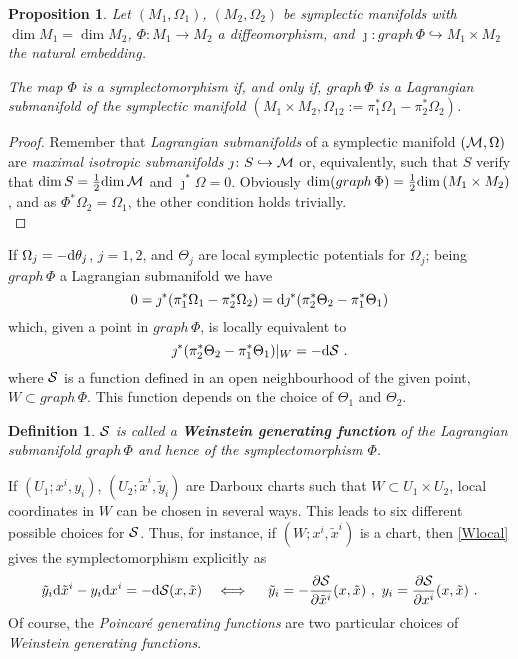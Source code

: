 \documentclass[12pt]{report}
\newtheorem{prop}[teor]{Proposition}
\newtheorem{definition}[teor]{Definition}
\def\beq{\begin{equation}}
\def\eeq{\end{equation}}
\def\derpar#1#2{\frac{\partial{#1}}{\partial{#2}}}
\def\qed{\ifvmode\removelastskip\fi
{\unskip\nobreak\hfil\penalty50\hbox{}\nobreak\hfil
\hbox{\vrule height1.2ex width1.2ex}\parfillskip=0pt
\finalhyphendemerits=0 \par\smallskip}}
\def\d{{\rm d}}
\begin{document}
\begin{prop}
Let $(M_1,\Omega_1)$, $(M_2,\Omega_2)$ be symplectic manifolds
with $\dim M_1 = \dim M_2$,
 $\Phi\colon M_1\to M_2$ a diffeomorphism, and
${\jmath}\colon graph\,\Phi\hookrightarrow M_1\times M_2$ the natural embedding.

The map $\Phi$ is a symplectomorphism if, and only if,
$graph\,\Phi$ is a Lagrangian submanifold of the symplectic manifold
$(M_1\times M_2,\Omega_{12}:=\pi_1^*\Omega_1-\pi_2^*\Omega_2)$.
\end{prop}
\begin{proof}
Remember that {\sl Lagrangian submanifolds} of a symplectic manifold 
$({\cal M},\Omega)$ are {\sl maximal isotropic submanifolds}
${\jmath}\colon S\hookrightarrow{\cal M}$ or, equivalently,
such that $S$ verify that ${\rm dim}\,S=\frac{1}{2}{\rm dim}\,{\cal M}$
and ${\jmath}^*\Omega=0$.
Obviously ${\rm dim}(graph\,\Phi)=\frac{1}{2}{\rm dim}\,(M_1\times M_2)$ ,
and as $\Phi^*\Omega_2=\Omega_1$,
the other condition holds trivially.
\\ \qed  \end{proof}

If $\Omega_j=-\d\theta_j$, $j=1,2$,
and $\Theta_j$ are local symplectic potentials for $\Omega_j$;
being $graph\,\Phi$ a Lagrangian submanifold we have
\beq
0=\jmath^*(\pi_1^*\Omega_1-\pi_2^*\Omega_2)=\d\jmath^*(\pi_2^*\Theta_2-\pi_1^*\Theta_1)
\eeq
which, given a point in  $graph\,\Phi$, is locally equivalent to
\beq
 \jmath^*(\pi_2^*\Theta_2-\pi_1^*\Theta_1)\vert_W=-\d{\cal S} \ .
\label{Wlocal}
\eeq
where ${\cal S}$ is a function defined in 
an open neighbourhood of the given point, $W\subset graph\,\Phi$.
This function depends on the choice of $\Theta_1$ and $\Theta_2$.

\begin{definition}
${\cal S}$ is called a
\textbf{Weinstein generating function} of the Lagrangian submanifold $graph\,\Phi$
and hence of the symplectomorphism $\Phi$.
\end{definition}

If  $(U_1; x^i,y_i)$, $(U_2; \tilde x^i,\tilde y_i)$ are Darboux charts such that
$W\subset U_1\times U_2$, local coordinates in $W$  can be chosen in several ways.
This leads to six different possible choices for ${\cal S}$.
Thus, for instance,  if $(W; x^i,\tilde x^i)$ is a chart,
then \eqref{Wlocal} gives the symplectomorphism  explicitly as
$$
\tilde y_i\d\tilde x^i-y_i\d x^i=-\d {\cal S}(x,\tilde x)
\quad \Longleftrightarrow\ \quad
\tilde y_i=-\derpar{{\cal S}}{\tilde x^i}(x,\tilde x)\ , \ y_i=\derpar{{\cal S}}{x^i}(x,\tilde x)\ .
$$
Of course, the {\sl Poincar\'e generating functions} are two particular choices
of {\sl Weinstein generating functions}.
\end{document}

